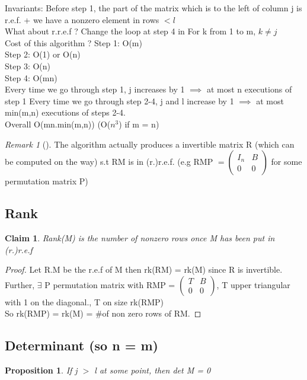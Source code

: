 \documentclass{article}
\newtheorem{proposition}{Proposition}
\newtheorem{claim}{Claim}
\theoremstyle{definition}
\theoremstyle{remark}
\newtheorem*{remark}{Remark}
\newcommand{\Rem}[3]{\begin{remark}[#1]\label{#2}#3\end{remark}}
\begin{document}
	Invariants: Before step 1, the part of the matrix which is to the left of column j is r.e.f. + we have a nonzero element in rows $<l$\\
	
	What about r.r.e.f ?
	Change the loop at step 4 in For k from 1 to m, $k \neq j$\\
	
	Cost of this algorithm ?
	Step 1: O(m)\\
	Step 2: O(1) or O(n)\\
	Step 3: O(n)\\
	Step 4: O(mn)\\
	
	Every time we go through step 1, j increases by 1 $\implies$ at most n executions of step 1
	Every time we go through step 2-4, j and l increase by 1 $\implies$ at most min(m,n) executions of steps 2-4.\\
	
	Overall O(mn.min(m,n)) (O($n^3$) if m = n)
	
	\Rem{}{}{The algorithm actually produces a invertible matrix R (which can be computed on the way) s.t RM is in (r.)r.e.f. (e.g RMP $= \begin{pmatrix}
		I_n&B\\0&0
		\end{pmatrix}$ for some permutation matrix P)}
	\subsection{Rank}
	\begin{claim}
		Rank(M) is the number of nonzero rows once M has been put in (r.)r.e.f
	\end{claim}
	
	\begin{proof}
		Let R.M be the r.e.f of M then rk(RM) = rk(M) since R is invertible.\\
		Further, $\exists$ P permutation matrix with RMP = $\begin{pmatrix}
		T&B\\0&0
		\end{pmatrix}$, T upper triangular with 1 on the diagonal., T on size rk(RMP)\\
		So rk(RMP) = rk(M) = \#of non zero rows of RM.
	\end{proof}
	
	\subsection{Determinant (so n = m)}
	\begin{proposition}
		If j $>$ l at some point, then det M = 0
	\end{proposition}
	
\end{document}
